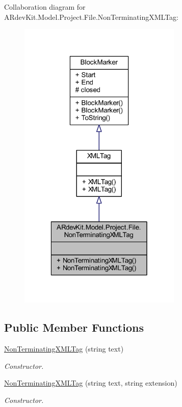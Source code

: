 Collaboration diagram for A\-Rdev\-Kit.\-Model.\-Project.\-File.\-Non\-Terminating\-X\-M\-L\-Tag\-:
\nopagebreak
\begin{figure}[H]
\begin{center}
\leavevmode
\includegraphics[width=220pt]{class_a_rdev_kit_1_1_model_1_1_project_1_1_file_1_1_non_terminating_x_m_l_tag__coll__graph}
\end{center}
\end{figure}
\subsection*{Public Member Functions}
\begin{DoxyCompactItemize}
\item 
\hyperlink{class_a_rdev_kit_1_1_model_1_1_project_1_1_file_1_1_non_terminating_x_m_l_tag_a06c6f90a43f306c87f1a7b8d5e3edb6e}{Non\-Terminating\-X\-M\-L\-Tag} (string text)
\begin{DoxyCompactList}\small\item\em Constructor. \end{DoxyCompactList}\item 
\hyperlink{class_a_rdev_kit_1_1_model_1_1_project_1_1_file_1_1_non_terminating_x_m_l_tag_a9f47b9498210c2c2547576f4db50ac13}{Non\-Terminating\-X\-M\-L\-Tag} (string text, string extension)
\begin{DoxyCompactList}\small\item\em Constructor. \end{DoxyCompactList}\end{DoxyCompactItemize}
